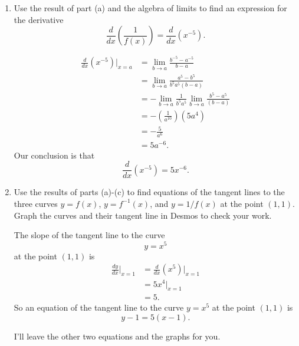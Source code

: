 \documentclass{ximera}
\begin{document}
\begin{question}
\begin{enumerate}
\begin{explanation}
\end{explanation}


\item Use the result of part (a) and the algebra of limits to find an expression for the derivative
\[
    \frac{d}{dx} \left( \frac{1}{f(x)} \right) =   \frac{d}{dx}\left( x^{-5} \right) .
\]


\begin{explanation}
\begin{align*}
     \frac{d}{dx}\left( x^{-5} \right)\Big|_{x=a} &= \lim_{b\to a} \frac{b^{-5} - a^{-5}}{b - a} \\
                                                                   &= \lim_{b\to a} \frac{a^5 - b^5}{b^5a^5(b-a)} \\
                                                                    &= - \lim_{b\to a} \frac{1}{b^5 a^5} \lim_{b\to a} \frac{b^5 - a^5}{(b-a)} \\
                                                                     &= -\left(\frac{1}{a^{10}}\right) (5 a^4) \\
                                                                     &= - \frac{5}{a^6} \\
                                                                     &= 5a^{-6} .
\end{align*}
Our  conclusion is that
\[
        \frac{d}{dx}\left( x^{-5} \right) = 5x^{-6} .
\]

\end{explanation}

\item Use the results of parts (a)-(c) to find equations of the tangent lines to the three curves $y=f(x)$, $y=f^{-1}(x)$, and $y=1/f(x)$ at the point $(1,1)$. Graph the curves and their tangent line in Desmos to check your work.

\begin{explanation}
The slope of the tangent line to the curve
\[
   y = x^5
\]
at the point $(1,1)$ is 
\begin{align*}
     \frac{dy}{dx}\Big|_{x=1} &= \frac{d}{dx}\left( x^5 \right) \Big|_{x=1} \\
                                          &= 5x^4 \Big|_{x=1} \\
                                          &= 5.
\end{align*}
So an equation of the tangent line to the curve $y=x^5$ at the point $(1,1)$ is
\[
 y - 1 = 5(x-1).
\]

I'll leave the other two equations and the graphs for you.

\end{explanation}

\end{enumerate}

\end{question}
\end{document}
